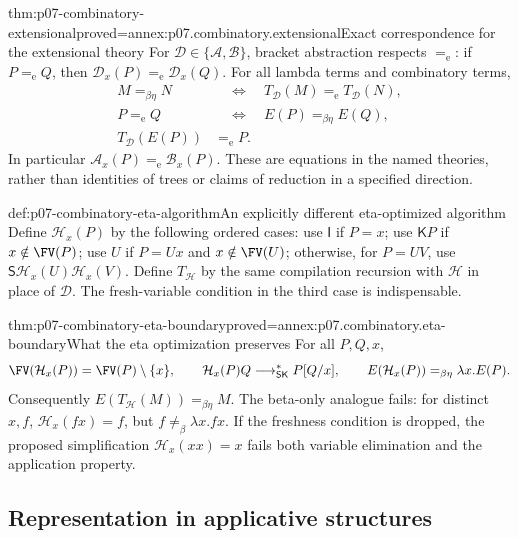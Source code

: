 \begin{hbtheorem}{thm:p07-combinatory-extensional}{proved=annex:p07.combinatory.extensional}{Exact correspondence for the extensional theory}
For \(\mathcal D\in\{\mathcal A,\mathcal B\}\), bracket abstraction respects
\(=_{\mathrm e}\): if \(P=_{\mathrm e}Q\), then
\(\mathcal D_x(P)=_{\mathrm e}\mathcal D_x(Q)\).
For all lambda terms and combinatory terms,
\[
\begin{split}
 M=_{\beta\eta}N&\quad\Longleftrightarrow\quad
 T_{\mathcal D}(M)=_{\mathrm e}T_{\mathcal D}(N),\\
 P=_{\mathrm e}Q&\quad\Longleftrightarrow\quad
 E(P)=_{\beta\eta}E(Q),\\
 T_{\mathcal D}(E(P))&=_{\mathrm e}P.
\end{split}
\]
In particular \(\mathcal A_x(P)=_{\mathrm e}\mathcal B_x(P)\).
These are equations in the named theories, rather than identities of trees or
claims of reduction in a specified direction.
\end{hbtheorem}

\begin{hbdefinition}{def:p07-combinatory-eta-algorithm}{An explicitly different eta-optimized algorithm}
Define \(\mathcal H_x(P)\) by the following ordered cases: use \(\mathsf I\)
if \(P=x\); use \(\mathsf K P\) if \(x\notin\FV(P)\); use \(U\) if
\(P=Ux\) and \(x\notin\FV(U)\); otherwise, for \(P=UV\), use
\(\mathsf S\mathcal H_x(U)\mathcal H_x(V)\).
Define \(T_{\mathcal H}\) by the same compilation recursion with
\(\mathcal H\) in place of \(\mathcal D\).
The fresh-variable condition in the third case is indispensable.
\end{hbdefinition}

\begin{hbtheorem}{thm:p07-combinatory-eta-boundary}{proved=annex:p07.combinatory.eta-boundary}{What the eta optimization preserves}
For all \(P,Q,x\),
\[
\FV(\mathcal H_x(P))=\FV(P)\setminus\{x\},\qquad
\mathcal H_x(P)Q\longrightarrow_{\mathsf{SK}}^*P[Q/x],\qquad
E(\mathcal H_x(P))=_{\beta\eta}\lambda x.E(P).
\]
Consequently \(E(T_{\mathcal H}(M))=_{\beta\eta}M\).
The beta-only analogue fails: for distinct \(x,f\),
\(\mathcal H_x(fx)=f\), but \(f\ne_\beta\lambda x.fx\).
If the freshness condition is dropped, the proposed simplification
\(\mathcal H_x(xx)=x\) fails both variable elimination and the application
property.
\end{hbtheorem}

\subsection{Representation in applicative structures}
\label{sec:p07-combinatory-algebras}

